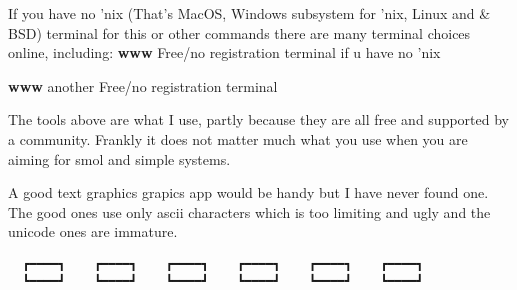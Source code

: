 \documentclass[
]{article}
\begin{document}
If you have no 'nix (That's MacOS, Windows subsystem for 'nix, Linux and
\& BSD) terminal for this or other commands there are many terminal
choices online, including: \textbf{www} Free/no registration terminal if
u have no 'nix

\textbf{www} another Free/no registration terminal

The tools above are what I use, partly because they are all free and
supported by a community. Frankly it does not matter much what you use
when you are aiming for smol and simple systems.

A good text graphics grapics app would be handy but I have never found
one. The good ones use only ascii characters which is too limiting and
ugly and the unicode ones are immature.

\begin{verbatim}
  ┏━━━━┓    ┏━━━━┓    ┏━━━━┓    ┏━━━━┓    ┏━━━━┓    ┏━━━━┓  
  ┗━━━━┛    ┗━━━━┛    ┗━━━━┛    ┗━━━━┛    ┗━━━━┛    ┗━━━━┛  
\end{verbatim}
\end{document}
